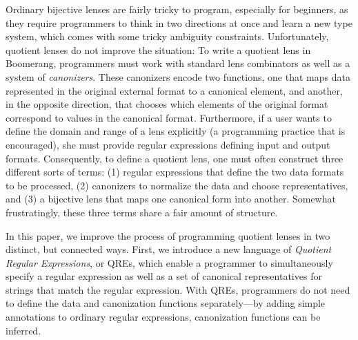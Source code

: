 \documentclass[acmsmall,review,anonymous]{acmart}\settopmatter{printfolios=true,printccs=false,printacmref=false}
\begin{document}
Ordinary bijective lenses are fairly tricky to program, especially for
beginners, as they require programmers to think in two directions at once
and learn a new type system, which comes with some tricky ambiguity constraints.
Unfortunately, quotient lenses do not improve the situation:  To
write a quotient lens in Boomerang, programmers must work with standard lens
combinators as well as a system of \emph{canonizers}.
These canonizers encode two functions, one that
maps data represented in the original external format
to a canonical element, and another, in the opposite direction, that chooses
which elements of the original format correspond to values in the canonical
format. Furthermore, if a user wants to define the domain and range of
a lens explicitly (a programming practice that is encouraged), she must
provide regular expressions defining input and output formats.
Consequently, to define a quotient lens, one must often
construct three different sorts
of terms: (1) regular expressions that define the two data formats
to be processed, (2) canonizers to normalize the data
and choose representatives, and (3) a bijective lens that maps
one canonical form into another.  Somewhat frustratingly,
these three terms share a fair amount of structure.

In this paper, we improve the process of programming quotient lenses
in two distinct, but connected ways. First, we
introduce a new language of {\em Quotient Regular Expressions}, or QREs, which
enable a programmer to simultaneously specify a regular expression as well as
a set of canonical representatives for strings that match the regular
expression. With
QREs, programmers do not need to define the data and canonization functions
separately---by adding simple annotations to ordinary regular expressions,
canonization functions can be inferred.
\end{document}
